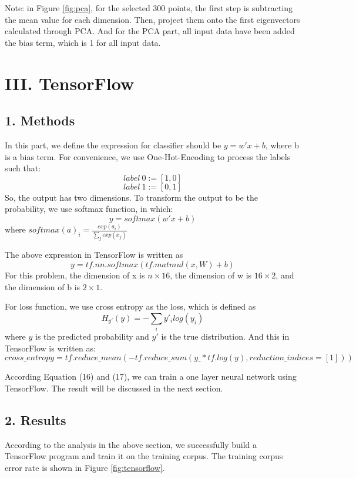 Note: in Figure \ref{fig:pca}, for the selected 300 points, the first step is subtracting the mean value for each dimension. Then, project them onto the first eigenvectors calculated through PCA. And for the PCA part, all input data have been added the bias term, which is 1 for all input data.

\newpage
\section*{\Large III. TensorFlow}

\subsection*{\large 1. Methods}
In this part, we define the expression for classifier should be $y = w'x + b$, where b is a bias term. For convenience, we use One-Hot-Encoding to process the labels such that:
$$ label \ 0 := [1, 0] $$
$$ label \ 1 := [0, 1] $$
So, the output has two dimensions. To transform the output to be the probability, we use softmax function, in which:
\begin{equation}
 y = softmax(w'x + b) 
\end{equation}
where $softmax(a)_i = \frac{exp(a_i)}{\sum_j{exp(x_j)}}$

The above expression in TensorFlow is written as 
$$y = tf.nn.softmax(tf.matmul(x, W) + b)$$
For this problem, the dimension of x is $n \times 16$, the dimension of w is $16 \times 2$, and the dimension of b is $2 \times 1$.

For loss function, we use cross entropy as the loss, which is defined as 
$$ H_{y'}(y) = -\sum_i{y'_i log(y_i)}$$
where $y$ is the predicted probability and $y'$ is the true distribution. And this in TensorFlow is written as:
\begin{equation}
cross\_entropy = tf.reduce\_mean(-tf.reduce\_sum(y\_ * tf.log(y), reduction\_indices=[1]))
\end{equation}

According Equation (16) and (17), we can train a one layer neural network using TensorFlow. The result will be discussed in the next section.

\subsection*{\large 2. Results}
According to the analysis in the above section, we successfully build a TensorFlow program and train it on the training corpus. The training corpus error rate is shown in Figure \ref{fig:tensorflow}.


